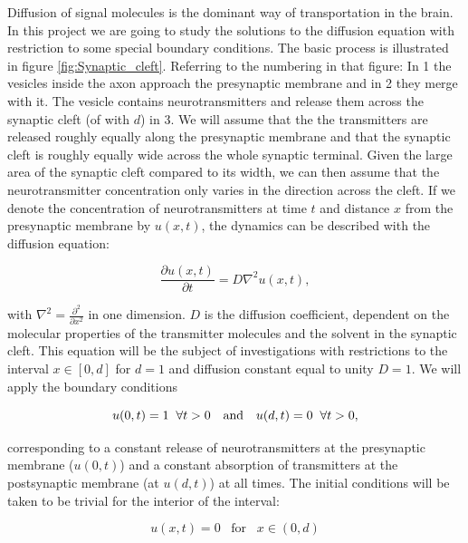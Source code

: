 \documentclass[a4paper, 11pt, notitlepage,english]{article}
\begin{document}
Diffusion of signal molecules is the dominant way of transportation in the brain. In this project we are going to study the solutions to the diffusion equation with restriction to some special boundary conditions. The basic process is illustrated in figure \ref{fig:Synaptic_cleft}.
Referring to the numbering in that figure: In 1 the vesicles inside the axon approach the presynaptic membrane and in 2 they merge with it. 
The vesicle contains neurotransmitters and release them across the synaptic cleft (of with $d$) in 3.
We will assume that the the transmitters are released roughly equally along the presynaptic
membrane and that the synaptic cleft is roughly equally wide across the whole synaptic terminal. Given the large area of the synaptic cleft compared to its width, we can then
assume that the neurotransmitter concentration only varies in the direction across the cleft.
If we denote the concentration of 
neurotransmitters at time $t$ and distance $x$ from the presynaptic membrane by $u(x,t)$, the dynamics can be described with the diffusion equation:

\begin{equation}
\frac{\partial u(x,t)}{\partial t} = D \nabla^2 u(x,t),
\label{eq:Diffusion_eq}
\end{equation}

with $\nabla^2 = \frac{\partial^2}{\partial x^2}$ in one dimension. $D$ is the diffusion coefficient, dependent on the molecular properties of the transmitter molecules and the solvent in the synaptic cleft.
This equation will be the subject of investigations with restrictions to the interval $x\in [0,d]$ for $d=1$ and diffusion constant equal to unity $D=1$.
We will apply the boundary conditions

\begin{equation}
u(0,t) = 1 \hspace{2mm} \forall t > 0 \hspace{10pt} \mathrm{and} \hspace{10pt} u(d,t) = 0 \hspace{2mm} \forall t > 0,
\label{eq:Boundary_condition}
\end{equation}

corresponding to a constant release of neurotransmitters at the presynaptic membrane ($u(0,t)$) and a constant absorption of transmitters at the postsynaptic membrane (at $u(d,t)$) at all times. The initial conditions will be taken to be trivial for the interior of the interval:

\begin{equation}
u(x,t) = 0 \hspace{10pt} \mathrm{for} \hspace{10pt} x\in(0,d) 
\label{eq:Initial_conditions}
\end{equation}
\end{document}
